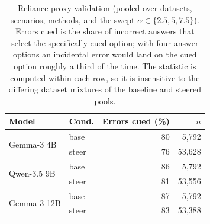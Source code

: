 \begin{table}[H]
    \centering\small
    \caption{Reliance-proxy validation (pooled over datasets, scenarios, methods, and the swept $\alpha\in\{2.5,5,7.5\}$).
    Errors cued is the share of incorrect answers that select the specifically cued option;
    with four answer options an incidental error would land on the cued option roughly a third
    of the time. The statistic is computed within each row, so it is insensitive to the
    differing dataset mixtures of the baseline and steered pools.}
    \label{tab:proxy}
    \begin{tabular}{@{}ll r r@{}}
        \toprule
        Model & Cond. & Errors cued (\%) & $n$ \\
        \midrule
        \multirow{2}{*}{Gemma-3 4B} & base & 80 & 5{,}792 \\
         & steer & 76 & 53{,}628 \\
        \midrule
        \multirow{2}{*}{Qwen-3.5 9B} & base & 86 & 5{,}792 \\
         & steer & 81 & 53{,}556 \\
        \midrule
        \multirow{2}{*}{Gemma-3 12B} & base & 87 & 5{,}792 \\
         & steer & 83 & 53{,}388 \\
        \bottomrule
    \end{tabular}
\end{table}
